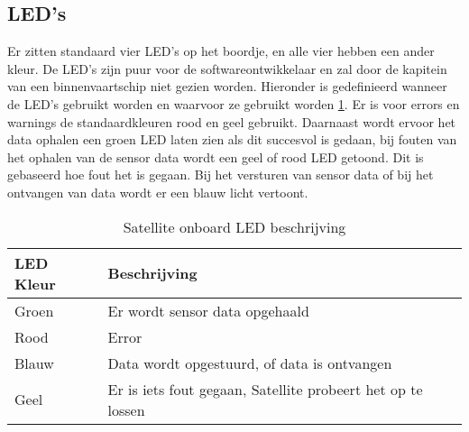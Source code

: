 \subsection{LED's}
Er zitten standaard vier LED’s op het boordje, en alle vier hebben een ander kleur. De LED’s zijn puur voor de softwareontwikkelaar en zal door de kapitein van een binnenvaartschip niet gezien worden. Hieronder is gedefinieerd wanneer de LED’s gebruikt worden en waarvoor ze gebruikt worden \ref{tab:leds}. Er is voor errors en warnings de standaardkleuren rood en geel gebruikt. Daarnaast wordt ervoor het data ophalen een groen LED laten zien als dit succesvol is gedaan, bij fouten van het ophalen van de sensor data wordt een geel of rood LED getoond. Dit is gebaseerd hoe fout het is gegaan. Bij het versturen van sensor data of bij het ontvangen van data wordt er een blauw licht vertoont.
\begin{table}[h!]
	\caption{Satellite onboard LED beschrijving}
	\begin{tabular}{lp{14.5cm}}
	\toprule
	\textbf{LED Kleur} 	& \textbf{Beschrijving} \\ \toprule
	Groen	& Er wordt sensor data opgehaald\\
	Rood	& Error \\
	Blauw	& Data wordt opgestuurd, of data is ontvangen \\
	Geel	& Er is iets fout gegaan, Satellite probeert het op te lossen\\  \bottomrule
	\end{tabular}
	\label{tab:leds}
\end{table}